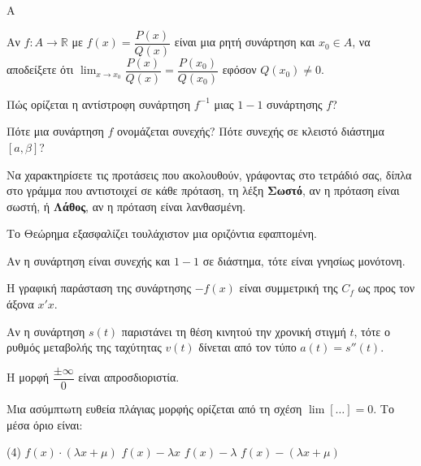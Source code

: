 \begin{thema}{A}
\begin{erwthma}
    \item Αν $ f:A\to\mathbb{R} $ με $ f(x)=\dfrac{P(x)}{Q(x)} $ είναι μια ρητή συνάρτηση και $ x_0\in A $, να αποδείξετε ότι $ {\displaystyle{\lim_{x\to x_0}{\dfrac{P(x)}{Q(x)}}=\dfrac{P(x_0)}{Q(x_0)}}} $ εφόσον $ Q(x_0)\neq0 $.
    \item Πώς ορίζεται η αντίστροφη συνάρτηση $f^{-1}$ μιας $1-1$ συνάρτησης $f$?
    \item Πότε μια συνάρτηση $f$ ονομάζεται συνεχής? Πότε συνεχής σε κλειστό διάστημα $[a, \beta]$?
    \item Να χαρακτηρίσετε τις προτάσεις που ακολουθούν, γράφοντας στο τετράδιό σας, δίπλα στο γράμμα που αντιστοιχεί σε κάθε πρόταση, τη λέξη \textbf{Σωστό}, αν η πρόταση είναι σωστή, ή \textbf{Λάθος}, αν η πρόταση είναι λανθασμένη.
    \begin{alist}
        \item Το Θεώρημα  εξασφαλίζει τουλάχιστον μια οριζόντια εφαπτομένη.
        \item Αν η συνάρτηση είναι συνεχής και $1-1$ σε διάστημα, τότε είναι γνησίως μονότονη.
        \item Η γραφική παράσταση της συνάρτησης $-f(x)$ είναι συμμετρική της $C_f$ ως προς τον άξονα $x'x$.
        \item Αν η συνάρτηση $s(t)$ παριστάνει τη θέση κινητού την χρονική στιγμή $t$, τότε ο ρυθμός μεταβολής της ταχύτητας $v(t)$ δίνεται από τον τύπο $a(t)=s''(t)$.
        \item Η μορφή $\dfrac{\pm\infty}{0}$ είναι απροσδιοριστία.
    \end{alist}
    \item Μια ασύμπτωτη ευθεία πλάγιας μορφής ορίζεται από τη σχέση $\lim\limits [\dots] = 0$. Το μέσα όριο είναι:
    \begin{tasks}[label=\let\textdexiakeraia\relax\alph*.](4)
        \task $f(x) \cdot (\lambda x + \mu)$
        \task $f(x) - \lambda x$
        \task $f(x) - \lambda$
        \task $f(x) - (\lambda x + \mu)$
    \end{tasks}
\end{erwthma}
\end{thema}


